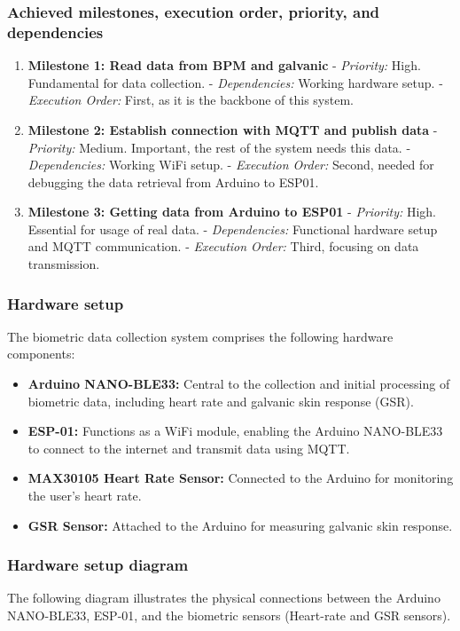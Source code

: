 \subsubsection{Achieved milestones, execution order, priority, and dependencies}
\begin{enumerate}
    \item \textbf{Milestone 1: Read data from BPM and galvanic}
       - \textit{Priority:} High. Fundamental for data collection.
       - \textit{Dependencies:} Working hardware setup.
       - \textit{Execution Order:} First, as it is the backbone of this system.

    \item \textbf{Milestone 2: Establish connection with MQTT and publish data}
       - \textit{Priority:} Medium. Important, the rest of the system needs this data.
       - \textit{Dependencies:} Working WiFi setup.
       - \textit{Execution Order:} Second, needed for debugging the data retrieval from Arduino to ESP01.

    \item \textbf{Milestone 3: Getting data from Arduino to ESP01}
       - \textit{Priority:} High. Essential for usage of real data.
       - \textit{Dependencies:} Functional hardware setup and MQTT communication.
       - \textit{Execution Order:} Third, focusing on data transmission.
\end{enumerate}

\subsubsection{Hardware setup}
The biometric data collection system comprises the following hardware components:
\begin{itemize}
    \item \textbf{Arduino NANO-BLE33:} Central to the collection and initial processing of biometric data, including heart rate and galvanic skin response (GSR).
    \item \textbf{ESP-01:} Functions as a WiFi module, enabling the Arduino NANO-BLE33 to connect to the internet and transmit data using MQTT.
    \item \textbf{MAX30105 Heart Rate Sensor:} Connected to the Arduino for monitoring the user's heart rate.
    \item \textbf{GSR Sensor:} Attached to the Arduino for measuring galvanic skin response.
\end{itemize}

\subsubsection{Hardware setup diagram}
The following diagram illustrates the physical connections between the Arduino NANO-BLE33, ESP-01, and the biometric sensors (Heart-rate and GSR sensors).

